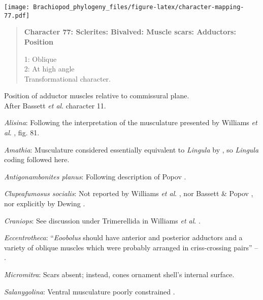 \documentclass[openany]{book}
\theoremstyle{definition}
\theoremstyle{definition}
\theoremstyle{definition}
\theoremstyle{remark}
\begin{document}
\texttt{[image: Brachiopod\_phylogeny\_files/figure-latex/character-mapping-77.pdf]}

\begin{quote}
\textbf{Character 77: Sclerites: Bivalved: Muscle scars: Adductors:
Position}

1: Oblique\\
2: At high angle\\
Transformational character.
\end{quote}

Position of adductor muscles relative to commissural plane.\\
After Bassett \emph{et al}.
\citeyearpar{Bassett2001Functionalmorphology} character 11.

\hypertarget{Alisina-coding-77}{}
\emph{Alisina}: Following the interpretation of the musculature
presented by Williams \emph{et al}.
\citeyearpar{Williams2000LinguliformeaCraniiformea}, fig. 81.

\hypertarget{Amathia-coding-77}{}
\emph{Amathia}: Musculature considered essentially equivalent to
\emph{Lingula} by \citet{Williams2000LinguliformeaCraniiformea}, so
\emph{Lingula} coding followed here.

\hypertarget{Antigonambonites_planus-coding-77}{}
\emph{Antigonambonites planus}: Following description of Popov
\citeyearpar{Popov1992TheCambrian}.

\hypertarget{Clupeafumosus_socialis-coding-77}{}
\emph{Clupeafumosus socialis}: Not reported by Williams \emph{et al}.
\citeyearpar{Williams2000LinguliformeaCraniiformea}, nor Bassett \&
Popov \citeyearpar{Bassett2017Earliestontogeny}, nor explicitly by
Dewing \citeyearpar{Dewing2001Hingemodifications}.

\hypertarget{Craniops-coding-77}{}
\emph{Craniops}: See discussion under Trimerellida in Williams \emph{et
al}. \citeyearpar{Williams2000LinguliformeaCraniiformea}.

\hypertarget{Eccentrotheca-coding-77}{}
\emph{Eccentrotheca}: ``\emph{Eoobolus} should have anterior and
posterior adductors and a variety of oblique muscles which were probably
arranged in criss-crossing pairs'' --
\citet{Balthasar2009Thebrachiopod}.

\hypertarget{Micromitra-coding-77}{}
\emph{Micromitra}: Scars absent; instead, cones ornament shell's
internal surface.

\hypertarget{Salanygolina-coding-77}{}
\emph{Salanygolina}: Ventral musculature poorly constrained
\citep{Williams2000LinguliformeaCraniiformea, Popov2009Earlyontogeny}.
\end{document}

